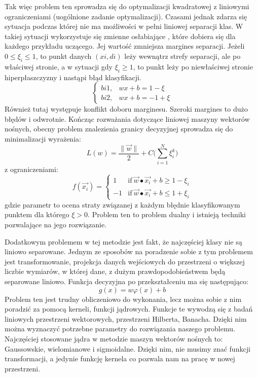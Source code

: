 Tak więc problem ten sprowadza się do optymalizacji kwadratowej z liniowymi ograniczeniami (uogólnione zadanie optymalizacji). 
Czasami jednak zdarza się sytuacja podczas której nie ma możliwości w pełni liniowej separacji klas. W takiej sytuacji wykorzystuje się zmienne osłabiające , które dobiera się dla każdego przykładu uczącego. Jej wartość zmniejsza margines separacji. Jeżeli $0 \le \xi_{i} \le 1$, to punkt danych $(xi,di)$ leży wewnątrz strefy separacji, ale po właściwej stronie, a w sytuacji gdy $\xi_{i} \ge 1$, to punkt leży po niewłaściwej stronie hiperpłaszczyzny i nastąpi błąd klasyfikacji. 
\[
    \begin{cases}
            bi1,&  wx+b = 1 - \xi\\
            bi2,& wx+b= -1 + \xi
    \end{cases}
\]
Również tutaj występuje konflikt doboru marginesu. Szeroki margines to dużo błędów i odwrotnie. Kończąc rozważania dotyczące liniowej maszyny wektorów nośnych, obecny problem znalezienia granicy decyzyjnej sprowadza się do minimalizacji wyrażenia:
\[
L(w) = \frac{\|\vec{w}\|}{2} + C\big(\sum_{i=1}^{N}\xi_{i}^{k}\big)
\]
z ograniczeniami:
\[
f(\vec{x_{i}}) = 
    \begin{cases}
            1 &  \text{if}\ \vec{w} \bullet \vec{x_{i}}+b \ge 1 - \xi_{i}\\
            -1 &  \text{if}\ \vec{w} \bullet \vec{x_{i}}+b \le 1 + \xi_{i}
    \end{cases}
\]
gdzie parametr  to ocena straty związanej z każdym błędnie klasyfikowanym punktem dla którego $\xi > 0$. Problem ten to problem dualny i istnieją techniki pozwalające na jego rozwiązanie.

Dodatkowym problemem w tej metodzie jest fakt, że najczęściej klasy nie są liniowo separowane. Jednym ze sposobów na poradzenie sobie z tym problemem jest transformowanie, projekcja danych wejściowych do przestrzeni o większej liczbie wymiarów, w której dane, z dużym prawdopodobieństwem będą separowane liniowo. Funkcja decyzyjna po przekształceniu ma się następująco:
\[
g(x) = w\varphi(x) + b
\]
Problem ten jest trudny obliczeniowo do wykonania, lecz można sobie z nim poradzić za pomocą kerneli, funkcji jądrowych. Funkcje te wywodzą się z badań liniowych przestrzeni wektorowych, przestrzeni Hilberta, Banacha. Dzięki nim można wyznaczyć potrzebne parametry do rozwiązania naszego problemu. Najczęściej stosowane jądra w metodzie maszyn wektorów nośnych to: Gaussowskie, wielomianowe i sigmoidalne. Dzięki nim, nie musimy znać funkcji transformacji, a jedynie funkcję kernela co pozwala nam na pracę w nowej przestrzeni. 

